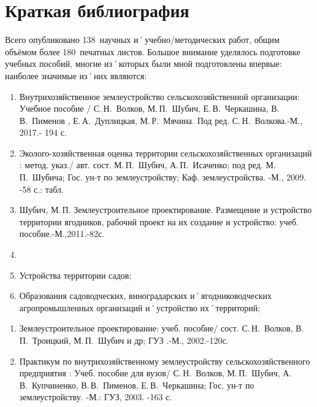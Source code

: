 ﻿\section{Краткая библиография}

Всего опубликовано 138~научных и˚учебно\-/методических работ, общим объёмом более 180~печатных листов. Большое внимание уделялось подготовке учебных пособий, многие из˚которых были мной подготовлены впервые: наиболее значимые из˚них являются: 

\begin{enumerate}
	\item Внутрихозяйственное землеустройство сельскохозяйственной организации: Учебное пособие / С.\,Н.~Волков, М.\,П.~Шубич, Е.\,В.~Черкашина, В.\,В.~Пименов , Е.\,А.~Дуплицкая, М.\,Р.~Мячина. Под ред. С.\,Н.~Волкова.-М., 2017.- 194 с.
	\item Эколого-хозяйственная оценка территории сельскохозяйственных организаций : метод. указ./ авт. сост. М.\,П.~Шубич, А.\,П.~Исаченко; под ред. М.\,П.~Шубича; Гос. ун-т по землеустройству; Каф. землеустройства. -М., 2009. -58 с.: табл.
	\item Шубич, М.\,П. Землеустроительное проектирование. Размещение и устройство территории ягодников, рабочий проект на их создание и устройство: учеб. пособие.-М.,2011.-82с.
	\item {}
	\item Устройства территории садов; 	
	\item Образования садоводческих, виноградарских и˚ягодниководческих агропромышленных организаций и˚устройство их˚территорий;	
\end{enumerate}	

\begin{enumerate}
	\item Землеустроительное проектирование: учеб. пособие/ сост. С.\,Н.~Волков, В.\,П.~Троицкий, М.\,П.~Шубич и др; ГУЗ .-М., 2002.-120с.
	\item Практикум по внутрихозяйственному землеустройству сельскохозяйственного предприятия : Учеб. пособие для вузов/ С.\,Н.~Волков, М.\,П.~Шубич, А.\,В.~Купчиненко, В.\,В.~Пименов, Е.\,В.~Черкашина; Гос. ун-т по землеустройству. -М.: ГУЗ, 2003. -163 с.
\end{enumerate}
